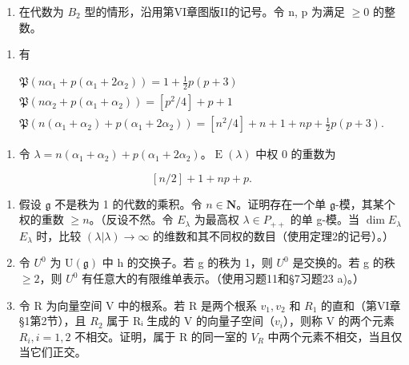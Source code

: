 \begin{enumerate}
\def\labelenumi{\arabic{enumi})}
\setcounter{enumi}{9}
\tightlist
\item
  在代数为 \(B_{2}\) 型的情形，沿用第VI章图版II的记号。令 n, p 为满足 \(\geq 0\) 的整数。
\end{enumerate}

\begin{enumerate}
\def\labelenumi{\alph{enumi})}
\tightlist
\item
  有
\end{enumerate}

\[
\begin{array}{c} \mathfrak {P} (n \alpha_ {1} + p (\alpha_ {1} + 2 \alpha_ {2})) = 1 + \frac {1}{2} p (p + 3) \\ \mathfrak {P} (n \alpha_ {2} + p (\alpha_ {1} + \alpha_ {2})) = [ p ^ {2} / 4 ] + p + 1 \\ \mathfrak {P} (n (\alpha_ {1} + \alpha_ {2}) + p (\alpha_ {1} + 2 \alpha_ {2})) = [ n ^ {2} / 4 ] + n + 1 + n p + \frac {1}{2} p (p + 3). \end{array}
\]

\begin{enumerate}
\def\labelenumi{\alph{enumi})}
\setcounter{enumi}{1}
\tightlist
\item
  令 \(\lambda = n(\alpha_{1} + \alpha_{2}) + p(\alpha_{1} + 2\alpha_{2})\)。\(\operatorname{E}(\lambda)\) 中权 0 的重数为
\end{enumerate}

\[
[ n / 2 ] + 1 + n p + p.
\]

\begin{enumerate}
\def\labelenumi{\arabic{enumi})}
\setcounter{enumi}{10}
\item
  假设 \(\mathfrak{g}\) 不是秩为 1 的代数的乘积。令 \(n\in \mathbf{N}\)。证明存在一个单 \(\mathfrak{g}\)-模，其某个权的重数 \(\geq n\)。（反设不然。令 \(E_{\lambda}\) 为最高权 \(\lambda \in P_{++}\) 的单 g-模。当 \(\dim E_{\lambda}\)\(E_{\lambda}\) 时，比较 \((\lambda|\lambda) \to \infty\) 的维数和其不同权的数目（使用定理2的记号）。）
\item
  令 \(U^{0}\) 为 \(\mathrm{U}(\mathfrak{g})\) 中 h 的交换子。若 g 的秩为 1，则 \(U^{0}\) 是交换的。若 g 的秩 \(\geq 2\)，则 \(U^{0}\) 有任意大的有限维单表示。（使用习题11和§7习题23 a)。）
\item
  令 R 为向量空间 V 中的根系。若 R 是两个根系 \(v_{1}, v_{2}\) 和 \(R_{1}\) 的直和（第VI章§1第2节），且 \(R_{2}\) 属于 Rᵢ 生成的 V 的向量子空间（\(v_{i}\)），则称 V 的两个元素 \(R_{i}, i = 1, 2\) 不相交。证明，属于 R 的同一室的 \(V_{R}\) 中两个元素不相交，当且仅当它们正交。
\end{enumerate}

